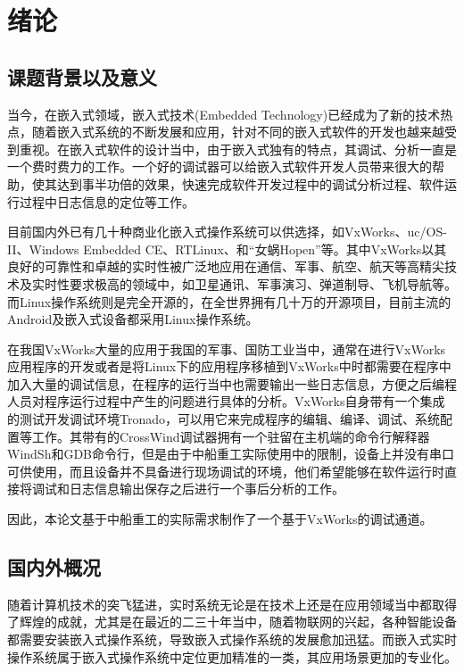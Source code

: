 \chapter{绪论}
\section{课题背景以及意义}
	当今，在嵌入式领域，嵌入式技术(Embedded Technology)已经成为了新的技术热点，随着嵌入式系统的不断发展和应用，针对不同的嵌入式软件的开发也越来越受到重视。在嵌入式软件的设计当中，由于嵌入式独有的特点，其调试、分析一直是一个费时费力的工作。一个好的调试器可以给嵌入式软件开发人员带来很大的帮助，使其达到事半功倍的效果，快速完成软件开发过程中的调试分析过程、软件运行过程中日志信息的定位等工作。
		
	目前国内外已有几十种商业化嵌入式操作系统可以供选择，如VxWorks、uc/OS-II、Windows Embedded CE、RTLinux、和“女蜗Hopen”等。其中VxWorks以其良好的可靠性和卓越的实时性被广泛地应用在通信、军事、航空、航天等高精尖技术及实时性要求极高的领域中，如卫星通讯、军事演习、弹道制导、飞机导航等。而Linux操作系统则是完全开源的，在全世界拥有几十万的开源项目，目前主流的Android及嵌入式设备都采用Linux操作系统。
	
	在我国VxWorks大量的应用于我国的军事、国防工业当中，通常在进行VxWorks应用程序的开发或者是将Linux下的应用程序移植到VxWorks中时都需要在程序中加入大量的调试信息，在程序的运行当中也需要输出一些日志信息，方便之后编程人员对程序运行过程中产生的问题进行具体的分析。VxWorks自身带有一个集成的测试开发调试环境Tronado，可以用它来完成程序的编辑、编译、调试、系统配置等工作。其带有的CrossWind调试器拥有一个驻留在主机端的命令行解释器WindSh和GDB命令行，但是由于中船重工实际使用中的限制，设备上并没有串口可供使用，而且设备并不具备进行现场调试的环境，他们希望能够在软件运行时直接将调试和日志信息输出保存之后进行一个事后分析的工作。
	
	因此，本论文基于中船重工的实际需求制作了一个基于VxWorks的调试通道。
	
			
\section{国内外概况}
	随着计算机技术的突飞猛进，实时系统无论是在技术上还是在应用领域当中都取得了辉煌的成就，尤其是在最近的二三十年当中，随着物联网的兴起，各种智能设备都需要安装嵌入式操作系统，导致嵌入式操作系统的发展愈加迅猛。而嵌入式实时操作系统属于嵌入式操作系统中定位更加精准的一类，其应用场景更加的专业化。
	
